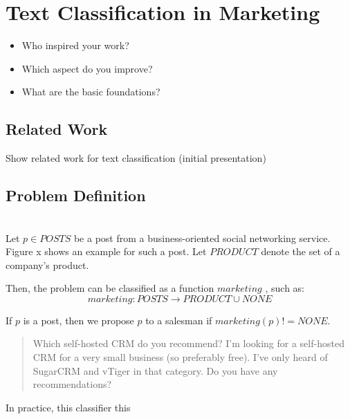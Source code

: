 
\section{Text Classification in Marketing}
\label{sec:related}
\begin{itemize}
	\item Who inspired your work?
	\item Which aspect do you improve?
	\item What are the basic foundations?
\end{itemize}

\subsection{Related Work}

Show related work for text classification (initial presentation)

\subsection{Problem Definition}

 \\
Let $p \in POSTS$ be a post from a business-oriented social networking service.
Figure x shows an example for such a post.
Let $PRODUCT$ denote the set of a company's product.

Then, the problem can be classified as a function $marketing$ , such as:
\begin{displaymath}
	marketing: POSTS \to PRODUCT \cup {NONE}
\end{displaymath}

If $p$ is a post, then we propose $p$ to a salesman if $marketing(p) != NONE$.

\begin{quote}
	Which self-hosted CRM do you recommend?
	I'm looking for a self-hosted CRM for a very small business (so preferably free).
	I've only heard of SugarCRM and vTiger in that category. Do you have any recommendations?
\end{quote}
In practice, this classifier this 

